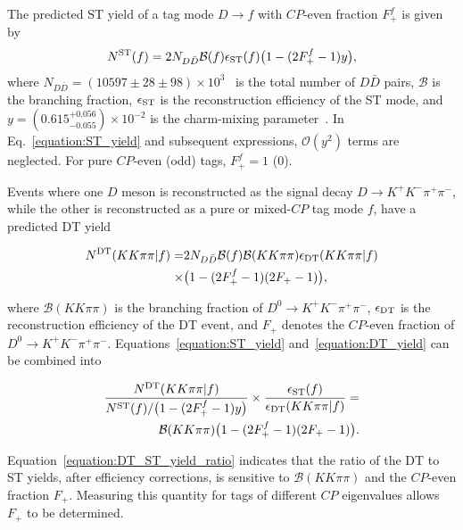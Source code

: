 \documentclass[12pt, a4paper, notitlepage, onecolumn]{article}
\begin{document}
The predicted ST yield of a tag mode $D\to f$ with $C\!P$-even fraction $F_+^f$ is given by
\begin{equation}
    N^{\rm ST}(f) = 2N_{D\bar{D}}\mathcal{B}(f)\epsilon_{\rm ST}(f)\big(1 - (2F_+^{f} - 1)y\big),
    \label{equation:ST_yield}
\end{equation}
where $N_{D\bar{D}} = (10597 \pm 28 \pm 98) \times 10^3$~\cite{cite:NDD} is the total number of $D\bar{D}$ pairs, $\mathcal{B}$ is the branching fraction, $\epsilon_{\rm ST}$ is the reconstruction efficiency of the ST mode, and $y = (0.615^{+0.056}_{-0.055})\times 10^{-2}$ is the charm-mixing parameter~\cite{cite:HFLAV2018}. In Eq.~\eqref{equation:ST_yield} and subsequent expressions, $\mathcal{O}(y^2)$ terms are neglected. For pure $C\!P$-even (odd) tags, $F_+^f = 1$ ($0$).

Events where one $D$ meson is reconstructed as the signal decay $D\to K^+K^-\pi^+\pi^-$, while the other is reconstructed as a pure or mixed-$C\!P$ tag mode $f$, have a predicted DT yield
\begin{linenomath}
    \begin{align}
        N^{\rm DT}(KK\pi\pi | f) =& 2N_{D\bar{D}}\mathcal{B}(f)\mathcal{B}(KK\pi\pi)\epsilon_{\rm DT}(KK\pi\pi | f) \nonumber \\
        \times&\big(1 - (2F_+^{f} - 1)(2F_+ - 1)\big),
        \label{equation:DT_yield}
    \end{align}
\end{linenomath}
where $\mathcal{B}(KK\pi\pi)$ is the branching fraction of $D^0\to K^+K^-\pi^+\pi^-$, $\epsilon_{\rm DT}$ is the reconstruction efficiency of the DT event, and $F_+$ denotes the $C\!P$-even fraction of $D^0\to K^+K^-\pi^+\pi^-$. Equations~\eqref{equation:ST_yield} and~\eqref{equation:DT_yield} can be combined into
\begin{linenomath}
    \begin{align}
        \frac{N^{\rm DT}(KK\pi\pi | f)}{N^{\rm ST}(f)/\big(1 - (2F_+^{f} - 1)y\big)}\times\frac{\epsilon_{\rm ST}(f)}{\epsilon_{\rm DT}(KK\pi\pi | f)} =& \nonumber \\
        \mathcal{B}(KK\pi\pi)\big(1 - (2F_+^{f} - 1)(2F_+ - 1)\big).
        \label{equation:DT_ST_yield_ratio}
    \end{align}
\end{linenomath}
Equation~\eqref{equation:DT_ST_yield_ratio} indicates that the ratio of the DT to ST yields, after efficiency corrections, is sensitive to $\mathcal{B}(KK\pi\pi)$ and the $C\!P$-even fraction $F_+$. Measuring this quantity for tags of different $C\!P$ eigenvalues allows $F_+$ to be determined.
\end{document}
